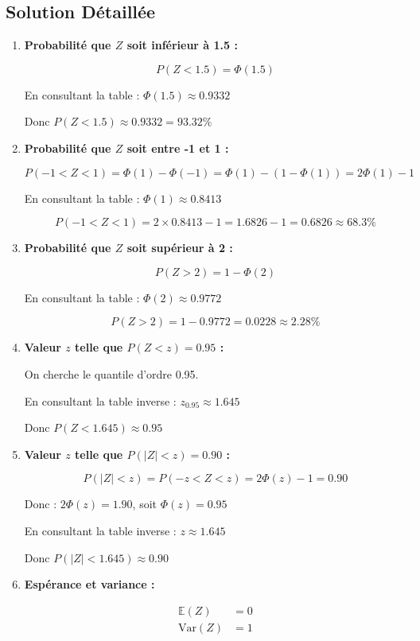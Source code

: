\documentclass[11pt,a4paper]{article}
\newcommand{\Var}{\text{Var}}
\newcommand{\E}{\mathbb{E}}
\begin{document}
\subsection{Solution Détaillée}

\begin{enumerate}
    \item \textbf{Probabilité que $Z$ soit inférieur à 1.5 :}
    
    $$P(Z < 1.5) = \Phi(1.5)$$
    
    En consultant la table : $\Phi(1.5) \approx 0.9332$
    
    Donc $P(Z < 1.5) \approx 0.9332 = 93.32\%$
    
    \item \textbf{Probabilité que $Z$ soit entre -1 et 1 :}
    
    $$P(-1 < Z < 1) = \Phi(1) - \Phi(-1) = \Phi(1) - (1 - \Phi(1)) = 2\Phi(1) - 1$$
    
    En consultant la table : $\Phi(1) \approx 0.8413$
    
    $$P(-1 < Z < 1) = 2 \times 0.8413 - 1 = 1.6826 - 1 = 0.6826 \approx 68.3\%$$
    
    \item \textbf{Probabilité que $Z$ soit supérieur à 2 :}
    
    $$P(Z > 2) = 1 - \Phi(2)$$
    
    En consultant la table : $\Phi(2) \approx 0.9772$
    
    $$P(Z > 2) = 1 - 0.9772 = 0.0228 \approx 2.28\%$$
    
    \item \textbf{Valeur $z$ telle que $P(Z < z) = 0.95$ :}
    
    On cherche le quantile d'ordre 0.95.
    
    En consultant la table inverse : $z_{0.95} \approx 1.645$
    
    Donc $P(Z < 1.645) \approx 0.95$
    
    \item \textbf{Valeur $z$ telle que $P(|Z| < z) = 0.90$ :}
    
    $$P(|Z| < z) = P(-z < Z < z) = 2\Phi(z) - 1 = 0.90$$
    
    Donc : $2\Phi(z) = 1.90$, soit $\Phi(z) = 0.95$
    
    En consultant la table inverse : $z \approx 1.645$
    
    Donc $P(|Z| < 1.645) \approx 0.90$
    
    \item \textbf{Espérance et variance :}
    
    \begin{align}
    \E(Z) &= 0 \\
    \Var(Z) &= 1
    \end{align}
\end{enumerate}
\end{document}
